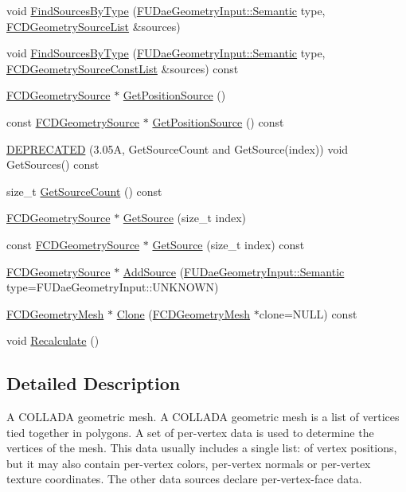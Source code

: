 \begin{DoxyCompactItemize}
void \hyperlink{classFCDGeometryMesh_a5a1bff9cf4323b7ed518110be9319c1e}{FindSourcesByType} (\hyperlink{namespaceFUDaeGeometryInput_a0f887d29f54b10338ebcf73789a7a061}{FUDaeGeometryInput::Semantic} type, \hyperlink{classfm_1_1pvector}{FCDGeometrySourceList} \&sources)
\item 
void \hyperlink{classFCDGeometryMesh_a07d2e6592dc1f1d78396f4c144c4343f}{FindSourcesByType} (\hyperlink{namespaceFUDaeGeometryInput_a0f887d29f54b10338ebcf73789a7a061}{FUDaeGeometryInput::Semantic} type, \hyperlink{classfm_1_1pvector}{FCDGeometrySourceConstList} \&sources) const 
\item 
\hyperlink{classFCDGeometrySource}{FCDGeometrySource} $\ast$ \hyperlink{classFCDGeometryMesh_a85bfd86c44d637d2fc61cceb21e915c7}{GetPositionSource} ()
\item 
const \hyperlink{classFCDGeometrySource}{FCDGeometrySource} $\ast$ \hyperlink{classFCDGeometryMesh_a370c274c5664868793d95b39d6259d75}{GetPositionSource} () const 
\item 
\hyperlink{classFCDGeometryMesh_a6edfcfac601ee70ed5c3686e8b847e5e}{DEPRECATED} (3.05A, GetSourceCount and GetSource(index)) void GetSources() const 
\item 
size\_\-t \hyperlink{classFCDGeometryMesh_a7581dd3fbd707e8e19832a7f7c57de26}{GetSourceCount} () const 
\item 
\hyperlink{classFCDGeometrySource}{FCDGeometrySource} $\ast$ \hyperlink{classFCDGeometryMesh_acf9352020a124bf2ebb371dd39e49ec6}{GetSource} (size\_\-t index)
\item 
const \hyperlink{classFCDGeometrySource}{FCDGeometrySource} $\ast$ \hyperlink{classFCDGeometryMesh_a6eed13657d4095926b0b298024bd5c3f}{GetSource} (size\_\-t index) const 
\item 
\hyperlink{classFCDGeometrySource}{FCDGeometrySource} $\ast$ \hyperlink{classFCDGeometryMesh_a394981429e2d56f865d4b5866da5fc8c}{AddSource} (\hyperlink{namespaceFUDaeGeometryInput_a0f887d29f54b10338ebcf73789a7a061}{FUDaeGeometryInput::Semantic} type=FUDaeGeometryInput::UNKNOWN)
\item 
\hyperlink{classFCDGeometryMesh}{FCDGeometryMesh} $\ast$ \hyperlink{classFCDGeometryMesh_a5556b53254358c1c765123c074a57d13}{Clone} (\hyperlink{classFCDGeometryMesh}{FCDGeometryMesh} $\ast$clone=NULL) const 
\item 
void \hyperlink{classFCDGeometryMesh_ad5227d055e5a3d1f7f0623724fab2586}{Recalculate} ()
\end{DoxyCompactItemize}


\subsection{Detailed Description}
A COLLADA geometric mesh. A COLLADA geometric mesh is a list of vertices tied together in polygons. A set of per-\/vertex data is used to determine the vertices of the mesh. This data usually includes a single list: of vertex positions, but it may also contain per-\/vertex colors, per-\/vertex normals or per-\/vertex texture coordinates. The other data sources declare per-\/vertex-\/face data.

